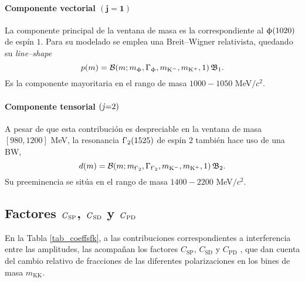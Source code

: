 \paragraph{Componente vectorial $\bm{(j=1)}$}
La componente principal de la ventana de masa es la correspondiente al $\upphi(1020)$ de espín $1$. Para su modelado se emplea una Breit--Wigner relativista, quedando su \emph{line--shape}
\begin{equation}
	p(m) = \mathcal{B}(m;m_{\upphi},\Gamma_{\upphi},m_{\text{K}{}^{-}},m_{\text{K}{}^{+}},1) \, \mathfrak{B}_1.
\end{equation}
Es la componente mayoritaria en el rango de masa $1000-1050$ MeV$/c^2$.


\paragraph{Componente tensorial $\text{(\textit{j}}\mathbf{=}\text{2)}$}
A pesar de que esta contribución es despreciable en la ventana de masa $[980,1200]$ MeV, la resonancia $\text{f'}_2(1525)$ de espín $2$ también hace uso de una BW,
\begin{equation}
	d(m) = \mathcal{B}(m;m_{\text{f'}_2},\Gamma_{\text{f'}_2},m_{\text{K}{}^{-}},m_{\text{K}{}^{+}},1) \, \mathfrak{B}_2.
\end{equation}
Su preeminencia se sitúa en el rango de masa $1400-2200$ MeV$/c^2$.





\subsection{Factores 
$\text{\textit{C}}_{\text{SP}}$, $\text{\textit{C}}_{\text{SD}}$ y $\text{\textit{C}}_{\text{PD}}$
}

\label{sec_factorescspcspdcssd}

En la Tabla \ref{tab_coeffsfk}, a las contribuciones correspondientes a interferencia entre las amplitudes, las acompañan los factores $C_{\text{SP}}$, $C_{\text{SD}}$ y $C_{\text{PD}}$ , que dan cuenta del cambio relativo de fracciones de las diferentes polarizaciones en los bines de masa $m_{\text{KK}}$.

